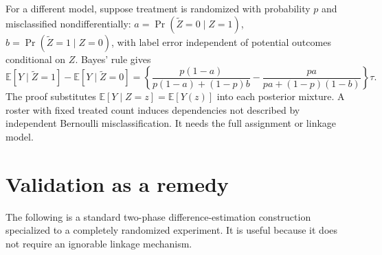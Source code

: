\documentclass[11pt]{article}
\newcommand{\E}{\mathbb E}
\begin{document}
For a different model, suppose treatment is randomized with probability $p$ and
misclassified nondifferentially: $a=\Pr(\widetilde Z=0\mid Z=1)$,
$b=\Pr(\widetilde Z=1\mid Z=0)$, with label error independent of potential outcomes
conditional on $Z$. Bayes' rule gives
\[
 \E[Y\mid\widetilde Z=1]-\E[Y\mid\widetilde Z=0]
 =\left\{\frac{p(1-a)}{p(1-a)+(1-p)b}
 -\frac{pa}{pa+(1-p)(1-b)}\right\}\tau.
\]
The proof substitutes $\E[Y\mid Z=z]=\E[Y(z)]$ into each posterior mixture.
A roster with fixed treated count induces dependencies not described by independent
Bernoulli misclassification. It needs the full assignment or linkage model.

\section{Validation as a remedy}
The following is a standard two-phase difference-estimation construction specialized
to a completely randomized experiment. It is useful because it does not require an
ignorable linkage mechanism.
\end{document}
